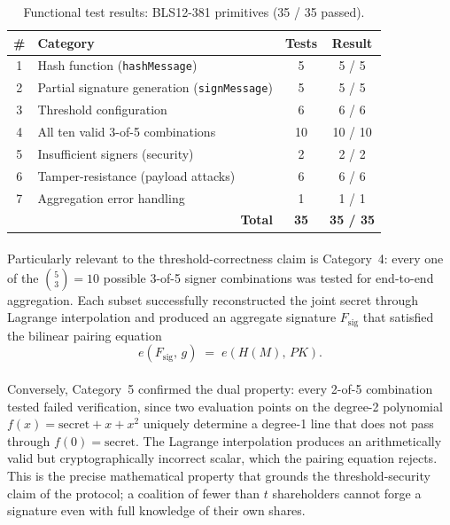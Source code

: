 \begin{table}[H]
  \centering
  \caption{Functional test results: BLS12-381 primitives (35 / 35 passed).}
  \label{tab:functional}
  \begin{tabular}{|c|l|c|c|}
    \hline
    \# & Category & Tests & Result \\\hline
    1 & Hash function (\texttt{hashMessage}) & 5 & 5 / 5 \\\hline
    2 & Partial signature generation (\texttt{signMessage}) & 5 & 5 / 5 \\\hline
    3 & Threshold configuration & 6 & 6 / 6 \\\hline
    4 & All ten valid 3-of-5 combinations & 10 & 10 / 10 \\\hline
    5 & Insufficient signers (security) & 2 & 2 / 2 \\\hline
    6 & Tamper-resistance (payload attacks) & 6 & 6 / 6 \\\hline
    7 & Aggregation error handling & 1 & 1 / 1 \\\hline
    \multicolumn{2}{|r|}{\textbf{Total}} & \textbf{35} & \textbf{35 / 35} \\\hline
  \end{tabular}
\end{table}

\paragraph{}Particularly relevant to the threshold-correctness claim is Category~4: every one of the $\binom{5}{3} = 10$ possible 3-of-5 signer combinations was tested for end-to-end aggregation. Each subset successfully reconstructed the joint secret through Lagrange interpolation and produced an aggregate signature $F_{\text{sig}}$ that satisfied the bilinear pairing equation
\[
e(F_{\text{sig}},\, g) \;=\; e(H(M),\, PK).
\]

\paragraph{}Conversely, Category~5 confirmed the dual property: every 2-of-5 combination tested failed verification, since two evaluation points on the degree-2 polynomial $f(x) = \text{secret} + x + x^2$ uniquely determine a degree-1 line that does not pass through $f(0) = \text{secret}$. The Lagrange interpolation produces an arithmetically valid but cryptographically incorrect scalar, which the pairing equation rejects. This is the precise mathematical property that grounds the threshold-security claim of the protocol; a coalition of fewer than $t$ shareholders cannot forge a signature even with full knowledge of their own shares.

